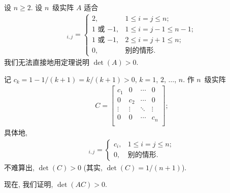 \documentclass[../libro.tex]{subfiles}
\begin{document}
\begin{example}[continues=emp:NonzeroDet3]
    设 \(n \geq 2\).
    设 \(n\)~级实阵 \(A\) 适合
    \begin{align*}
        [A]_{i,j} =
        \begin{cases}
            2,
            & 1 \leq i = j \leq n;         \\
            \text{\(1\) 或 \(-1\)},
            & 1 \leq i = j - 1 \leq n - 1; \\
            \text{\(1\) 或 \(-1\)},
            & 2 \leq i = j + 1 \leq n;     \\
            0,
            & \text{别的情形}.
        \end{cases}
    \end{align*}
    我们无法直接地用定理说明 \(\det {(A)} > 0\).

    记 \(c_k = 1 - 1/(k+1) = k/(k+1) > 0\),
    \(k = 1\), \(2\), \(\dots\), \(n\).
    作 \(n\)~级实阵
    \begin{align*}
        C =
        \begin{bmatrix}
            c_1    & 0      & \cdots & 0      \\
            0      & c_2    & \cdots & 0      \\
            \vdots & \vdots & \ddots & \vdots \\
            0      & 0      & \cdots & c_n    \\
        \end{bmatrix};
    \end{align*}
    具体地,
    \begin{align*}
        [C]_{i,j} =
        \begin{cases}
            c_i, & 1 \leq i = j \leq n; \\
            0,   & \text{别的情形}.
        \end{cases}
    \end{align*}
    不难算出, \(\det {(C)} > 0\)
    (其实, \(\det {(C)} = 1/(n+1)\)).

    现在, 我们证明, \(\det {(AC)} > 0\).


\end{example}
\end{document}
